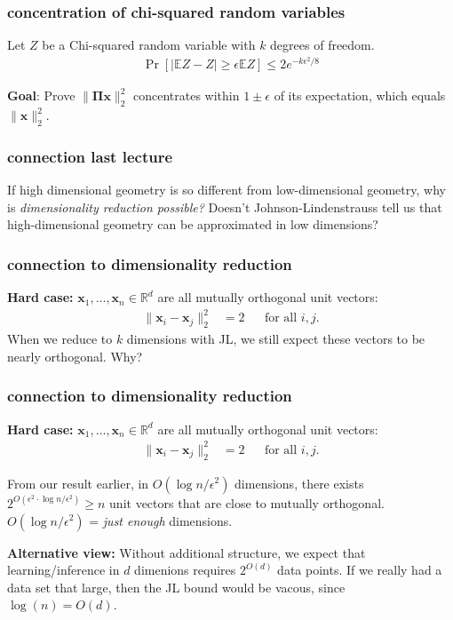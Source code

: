 \documentclass[compress]{beamer}
\newcommand{\bs}[1]{\boldsymbol{#1}}
\newcommand{\bv}[1]{\mathbf{#1}}
\newcommand{\R}{\mathbb{R}}
\newcommand{\E}{\mathbb{E}}
\begin{document}
\begin{frame}[t]
	\frametitle{concentration of chi-squared random variables}
	\begin{lemma} Let $Z$ be a Chi-squared random variable with $k$ degrees of freedom. 
		\begin{align*}
			\Pr[|\E Z - Z| \geq \epsilon \E Z] \leq 2 e^{-k\epsilon^2/8}
		\end{align*}
	\end{lemma}
	
	\vspace{8em}
	\begin{block}{\vspace*{-3ex}}
		\small \textbf{Goal}: Prove $\|\bs{\Pi} \bv{x} \|_2^2$ concentrates within $1 \pm \epsilon$ of its expectation, which equals $\|\bv{x} \|_2^2$.
	\end{block}
\end{frame}

\begin{frame}
	\frametitle{connection last lecture}
	If high dimensional geometry is so different from low-dimensional geometry, why is \emph{dimensionality reduction possible?} Doesn't Johnson-Lindenstrauss tell us that high-dimensional geometry can be approximated in low dimensions?
\end{frame}

\begin{frame}[t]
	\frametitle{connection to dimensionality reduction}
	\textbf{Hard case:} $\bv{x}_1, \ldots, \bv{x}_n \in \R^d$ are all mutually orthogonal unit vectors: 
	\begin{align*}
		\|\bv{x}_i - \bv{x}_j\|_2^2 &= 2 & &\text{for all $i,j$.}  
	\end{align*}
	When we reduce to $k$ dimensions with JL, we still expect these vectors to be nearly orthogonal. Why?
	
\end{frame}

\begin{frame}[t]
	\frametitle{connection to dimensionality reduction}
	\textbf{Hard case:} $\bv{x}_1, \ldots, \bv{x}_n \in \R^d$ are all mutually orthogonal unit vectors: 
	\begin{align*}
		\|\bv{x}_i - \bv{x}_j\|_2^2 &= 2 & &\text{for all $i,j$.}  
	\end{align*}
	
	From our result earlier, in $O(\log n /\epsilon^2)$ dimensions, there exists $2^{O(\epsilon^2\cdot \log n /\epsilon^2)} \geq n $ unit vectors that are close to mutually orthogonal.
	\alert{$O(\log n /\epsilon^2)$ = \emph{just enough} dimensions.}
	\vspace{2em}
	
	\textbf{Alternative view:} Without additional structure, we expect that learning/inference in $d$ dimenions requires $2^{O(d)}$ data points. If we really had a data set that large, then the JL bound would be vacous, since $\log(n) = O(d)$.
\end{frame}
\end{document}
